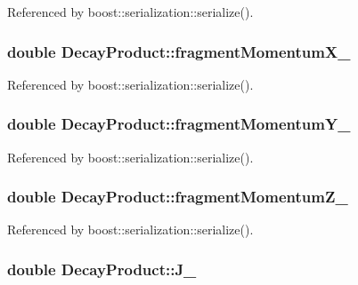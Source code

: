 Referenced by boost\-::serialization\-::serialize().

\hypertarget{classDecayProduct_ab1d61ecb4f27f726d867b00a27bdc1f0}{
\subsubsection[{fragment\-Momentum\-X\-\_\-}]{\setlength{\rightskip}{0pt plus 5cm}double Decay\-Product\-::fragment\-Momentum\-X\-\_\-}}\label{classDecayProduct_ab1d61ecb4f27f726d867b00a27bdc1f0}


Referenced by boost\-::serialization\-::serialize().

\hypertarget{classDecayProduct_aecdeb7a1909ba213abcd127d68f7f010}{
\subsubsection[{fragment\-Momentum\-Y\-\_\-}]{\setlength{\rightskip}{0pt plus 5cm}double Decay\-Product\-::fragment\-Momentum\-Y\-\_\-}}\label{classDecayProduct_aecdeb7a1909ba213abcd127d68f7f010}


Referenced by boost\-::serialization\-::serialize().

\hypertarget{classDecayProduct_a147294524969225c542fe2cc5d18e3ea}{
\subsubsection[{fragment\-Momentum\-Z\-\_\-}]{\setlength{\rightskip}{0pt plus 5cm}double Decay\-Product\-::fragment\-Momentum\-Z\-\_\-}}\label{classDecayProduct_a147294524969225c542fe2cc5d18e3ea}


Referenced by boost\-::serialization\-::serialize().

\hypertarget{classDecayProduct_a7b929cb262067fbfae442cc2158a157b}{
\subsubsection[{J\-\_\-}]{\setlength{\rightskip}{0pt plus 5cm}double Decay\-Product\-::\-J\-\_\-}}\label{classDecayProduct_a7b929cb262067fbfae442cc2158a157b}



